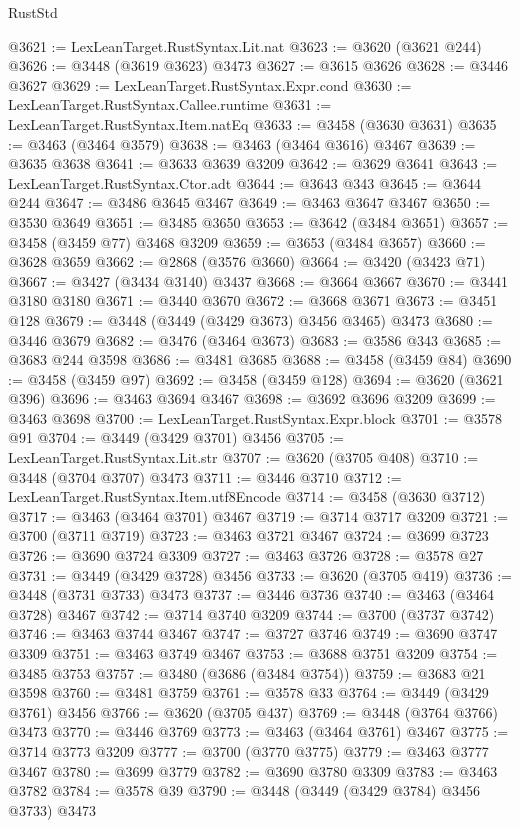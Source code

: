 \begin{lexlean}{RustStd}
\begin{coremodule}
{{{{{{{{{{{{{{{{{{{@3621 := LexLeanTarget.RustSyntax.Lit.nat
@3623 := @3620 (@3621 @244)
@3626 := @3448 (@3619 @3623) @3473
@3627 := @3615 @3626
@3628 := @3446 @3627
@3629 := LexLeanTarget.RustSyntax.Expr.cond
@3630 := LexLeanTarget.RustSyntax.Callee.runtime
@3631 := LexLeanTarget.RustSyntax.Item.natEq
@3633 := @3458 (@3630 @3631)
@3635 := @3463 (@3464 @3579)
@3638 := @3463 (@3464 @3616) @3467
@3639 := @3635 @3638
@3641 := @3633 @3639 @3209
@3642 := @3629 @3641
@3643 := LexLeanTarget.RustSyntax.Ctor.adt
@3644 := @3643 @343
@3645 := @3644 @244
@3647 := @3486 @3645 @3467
@3649 := @3463 @3647 @3467
@3650 := @3530 @3649
@3651 := @3485 @3650
@3653 := @3642 (@3484 @3651)
@3657 := @3458 (@3459 @77) @3468 @3209
@3659 := @3653 (@3484 @3657)
@3660 := @3628 @3659
@3662 := @2868 (@3576 @3660)
@3664 := @3420 (@3423 @71)
@3667 := @3427 (@3434 @3140) @3437
@3668 := @3664 @3667
@3670 := @3441 @3180 @3180
@3671 := @3440 @3670
@3672 := @3668 @3671
@3673 := @3451 @128
@3679 := @3448 (@3449 (@3429 @3673) @3456 @3465) @3473
@3680 := @3446 @3679
@3682 := @3476 (@3464 @3673)
@3683 := @3586 @343
@3685 := @3683 @244 @3598
@3686 := @3481 @3685
@3688 := @3458 (@3459 @84)
@3690 := @3458 (@3459 @97)
@3692 := @3458 (@3459 @128)
@3694 := @3620 (@3621 @396)
@3696 := @3463 @3694 @3467
@3698 := @3692 @3696 @3209
@3699 := @3463 @3698
@3700 := LexLeanTarget.RustSyntax.Expr.block
@3701 := @3578 @91
@3704 := @3449 (@3429 @3701) @3456
@3705 := LexLeanTarget.RustSyntax.Lit.str
@3707 := @3620 (@3705 @408)
@3710 := @3448 (@3704 @3707) @3473
@3711 := @3446 @3710
@3712 := LexLeanTarget.RustSyntax.Item.utf8Encode
@3714 := @3458 (@3630 @3712)
@3717 := @3463 (@3464 @3701) @3467
@3719 := @3714 @3717 @3209
@3721 := @3700 (@3711 @3719)
@3723 := @3463 @3721 @3467
@3724 := @3699 @3723
@3726 := @3690 @3724 @3309
@3727 := @3463 @3726
@3728 := @3578 @27
@3731 := @3449 (@3429 @3728) @3456
@3733 := @3620 (@3705 @419)
@3736 := @3448 (@3731 @3733) @3473
@3737 := @3446 @3736
@3740 := @3463 (@3464 @3728) @3467
@3742 := @3714 @3740 @3209
@3744 := @3700 (@3737 @3742)
@3746 := @3463 @3744 @3467
@3747 := @3727 @3746
@3749 := @3690 @3747 @3309
@3751 := @3463 @3749 @3467
@3753 := @3688 @3751 @3209
@3754 := @3485 @3753
@3757 := @3480 (@3686 (@3484 @3754))
@3759 := @3683 @21 @3598
@3760 := @3481 @3759
@3761 := @3578 @33
@3764 := @3449 (@3429 @3761) @3456
@3766 := @3620 (@3705 @437)
@3769 := @3448 (@3764 @3766) @3473
@3770 := @3446 @3769
@3773 := @3463 (@3464 @3761) @3467
@3775 := @3714 @3773 @3209
@3777 := @3700 (@3770 @3775)
@3779 := @3463 @3777 @3467
@3780 := @3699 @3779
@3782 := @3690 @3780 @3309
@3783 := @3463 @3782
@3784 := @3578 @39
@3790 := @3448 (@3449 (@3429 @3784) @3456 @3733) @3473
}}}}}}}}}}}}}}}}}}}
\end{coremodule}
\end{lexlean}
